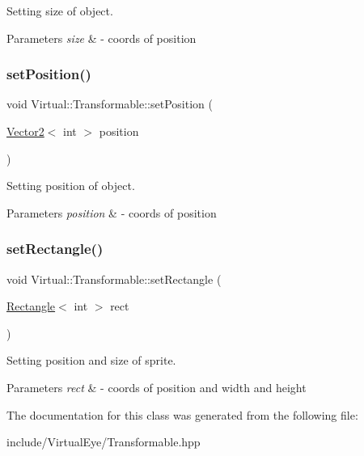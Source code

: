 Setting size of object. 


\begin{DoxyParams}{Parameters}
{\em size} & -\/ coords of position \\
\hline
\end{DoxyParams}
\hypertarget{class_virtual_1_1_transformable_a2c1168cb1d892fbddd978c7d45dfcba9}{}\label{class_virtual_1_1_transformable_a2c1168cb1d892fbddd978c7d45dfcba9} 
\subsubsection{\texorpdfstring{set\+Position()}{setPosition()}}
{\footnotesize\ttfamily void Virtual\+::\+Transformable\+::set\+Position (\begin{DoxyParamCaption}\item[{\hyperlink{struct_virtual_1_1_vector2}{Vector2}$<$ int $>$}]{position }\end{DoxyParamCaption})}



Setting position of object. 


\begin{DoxyParams}{Parameters}
{\em position} & -\/ coords of position \\
\hline
\end{DoxyParams}
\hypertarget{class_virtual_1_1_transformable_ad86a98728222a2b879afa41ba27dfc58}{}\label{class_virtual_1_1_transformable_ad86a98728222a2b879afa41ba27dfc58} 
\subsubsection{\texorpdfstring{set\+Rectangle()}{setRectangle()}}
{\footnotesize\ttfamily void Virtual\+::\+Transformable\+::set\+Rectangle (\begin{DoxyParamCaption}\item[{\hyperlink{struct_virtual_1_1_rectangle}{Rectangle}$<$ int $>$}]{rect }\end{DoxyParamCaption})}



Setting position and size of sprite. 


\begin{DoxyParams}{Parameters}
{\em rect} & -\/ coords of position and width and height \\
\hline
\end{DoxyParams}


The documentation for this class was generated from the following file\+:\begin{DoxyCompactItemize}
\item 
include/\+Virtual\+Eye/Transformable.\+hpp\end{DoxyCompactItemize}
